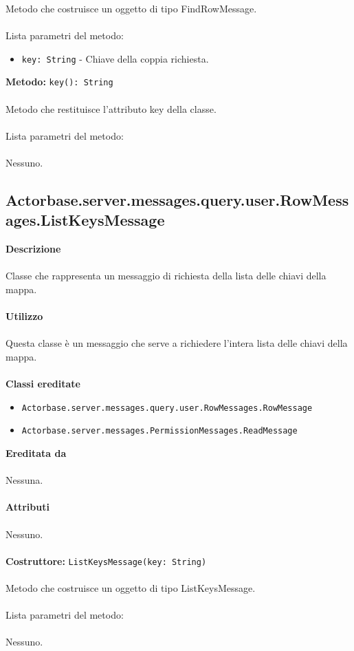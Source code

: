 \documentclass[a4paper]{article}
\begin{document}
		Metodo che costruisce un oggetto di tipo FindRowMessage.
			\\ \\
		Lista parametri del metodo:
			\begin{itemize}
				\item \texttt{key: String} - Chiave della coppia richiesta.
			\end{itemize}
		\textbf{Metodo: }\texttt{key(): String}
			\\ \\
		Metodo che restituisce l'attributo key della classe.
			\\ \\
		Lista parametri del metodo:
			\\ \\
			Nessuno.		
			
	\subsection{Actorbase.server.messages.query.user.RowMessages.ListKeysMessage}
		\textbf{Descrizione}
			\\ \\
		Classe che rappresenta un messaggio di richiesta della lista delle chiavi della mappa.
			\\ \\
		\textbf{Utilizzo}
			\\ \\
		Questa classe è un messaggio che serve a richiedere l'intera lista delle chiavi della mappa.
			\\ \\
		\textbf{Classi ereditate}
			\begin{itemize}
				\item \texttt{Actorbase.server.messages.query.user.RowMessages.RowMessage }
				\item \texttt{Actorbase.server.messages.PermissionMessages.ReadMessage }
			\end{itemize}
		\textbf{Ereditata da}
			\\ \\
			Nessuna.
			\\ \\
		\textbf{Attributi}
			\\ \\
			Nessuno.
			\\ \\
		\textbf{Costruttore: }\texttt{ListKeysMessage(key: String)}
			\\ \\
		Metodo che costruisce un oggetto di tipo ListKeysMessage.
			\\ \\
		Lista parametri del metodo:
			\\ \\
			Nessuno.
			
\end{document}
